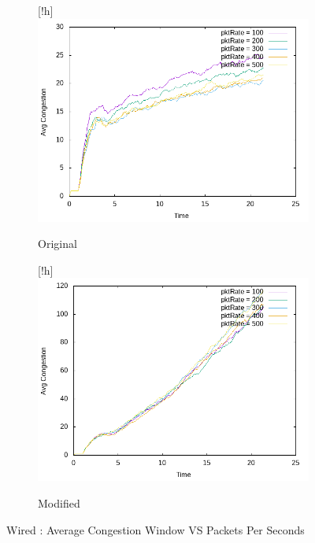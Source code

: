     \begin{figure}[!h]
    	\centering
    	
    	\begin{subfigure}{0.9\textwidth}[!h] %
    		\includegraphics[width=.95\textwidth]{Pictures/Wired/Original/Avg_CongestionVSpktRate.png}
    		\caption{Original} %
    	\end{subfigure}
    	
    	\vspace{1em} %
    	
    	\begin{subfigure}{0.9\textwidth}[!h] %
    		\includegraphics[width=.95\textwidth]{Pictures/Wired/Modified/Avg_CongestionVSpktRate.png}
    		\caption{Modified} %
    	\end{subfigure}
    	
    	\caption{Wired : Average Congestion Window VS Packets Per Seconds} %
    \end{figure}

